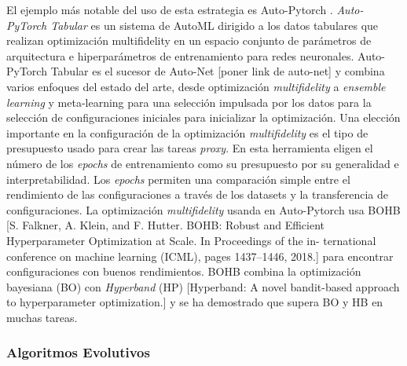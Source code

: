 El ejemplo más notable del uso de esta estrategia es Auto-Pytorch \cite{zimmer2021auto}. \textit{Auto-PyTorch Tabular} es un sistema de AutoML dirigido a los datos tabulares que realizan optimización  multifidelity en un espacio conjunto de parámetros de arquitectura e hiperparámetros de entrenamiento para redes neuronales. Auto-PyTorch Tabular es el sucesor de Auto-Net [poner link de auto-net] y combina varios enfoques del estado del arte, desde optimización \textit{multifidelity} a \textit{ensemble learning} y meta-learning para una selección impulsada por los datos para la selección de configuraciones iniciales para inicializar la optimización. Una elección importante en la configuración de la optimización \textit{multifidelity} es el tipo de presupuesto usado para crear las tareas \textit{proxy}. En esta herramienta eligen el número de los \textit{epochs} de entrenamiento como su presupuesto por su generalidad e interpretabilidad. Los \textit{epochs} permiten una comparación simple entre el rendimiento de las configuraciones a través de los datasets y la transferencia de configuraciones. La optimización \textit{multifidelity} usanda en Auto-Pytorch usa BOHB [S. Falkner, A. Klein, and F. Hutter. BOHB: Robust and Efficient Hyperparameter Optimization at Scale. In Proceedings of the in- ternational conference on machine learning (ICML), pages 1437–1446, 2018.] para encontrar configuraciones con buenos rendimientos. BOHB combina la optimización bayesiana (BO) con \textit{Hyperband} (HP) [Hyperband: A novel bandit-based approach to hyperparameter optimization.] y se ha demostrado que supera BO y HB en muchas tareas.

\subsubsection{Algoritmos Evolutivos}



